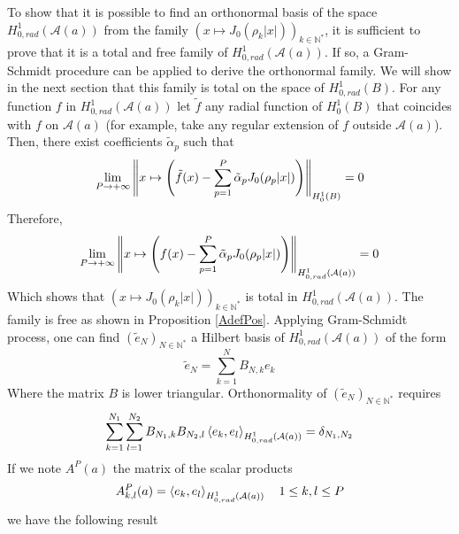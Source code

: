 \documentclass[11pt,a4paper]{article}
\begin{document}
To show that it is possible to find an orthonormal basis of the space $H^1_{0,rad}(\mathcal{A}(a))$ from the family $\left(x \mapsto J_0(\rho_k |x|)\right)_{k \in \mathbb{N^*}}$, it is sufficient to prove that it is a total and free family of $H^1_{0,rad}(\mathcal{A}(a))$. If so, a Gram-Schmidt procedure can be applied to derive the orthonormal family. We will show in the next section that this family is total on the space of $H^1_{0,rad}(B)$. For any function $f$ in $H^1_{0,rad}(\mathcal{A}(a))$ let $\tilde{f}$ any radial function of $H^1_0(B)$ that coincides with $f$ on $\mathcal{A}(a)$ (for example, take any regular extension of $f$ outside $\mathcal{A}(a)$). Then, there exist coefficients $\tilde{\alpha}_p$ such that 
\[\lim_{P\to+\infty} \left\|x\mapsto \left(\tilde{f}(x) - \sum_{p=1}^P\tilde{\alpha}_p J_0(\rho_p|x|)\right)\right\|_{H^1_0(B)} = 0 \]
Therefore, 
\[\lim_{P\to+\infty} \left\|x\mapsto \left(f(x) - \sum_{p=1}^P\tilde{\alpha}_p J_0(\rho_p|x|)\right)\right\|_{H^1_{0,rad}(\mathcal{A}(a))} = 0 \]
Which shows that $\left(x \mapsto J_0(\rho_k |x|)\right)_{k \in \mathbb{N^*}}$ is total in $H^1_{0,rad}(\mathcal{A}(a))$. 
The family is free as shown in Proposition \ref{AdefPos}. Applying Gram-Schmidt process, one can find $(\tilde{e}_N)_{N \in \mathbb{N}^*}$ a Hilbert basis of $H^1_{0,rad}(\mathcal{A}(a))$ of the form 
\[\tilde{e}_N = \sum_{k=1}^N B_{N,k}e_k\]
Where the matrix $B$ is lower triangular. Orthonormality of $(\tilde{e}_N)_{N \in \mathbb{N}^*}$ requires
\begin{equation}
\sum_{k=1}^{N_1}\sum_{l=1}^{N_2} B_{N_1,k}B_{N_2,l}\left\langle e_k,e_l\right\rangle_{H^1_{0,rad}(\mathcal{A}(a))} = \delta_{N_1,N_2}
\label{BientotChol}
\end{equation}
If we note $A^P(a)$ the matrix of the scalar products 
\[ A^P_{k,l}(a) = \left\langle e_k,e_l\right\rangle_{H^1_{0,rad}(\mathcal{A}(a))} \quad 1\leq k,l \leq P\]
we have the following result 
\end{document}
